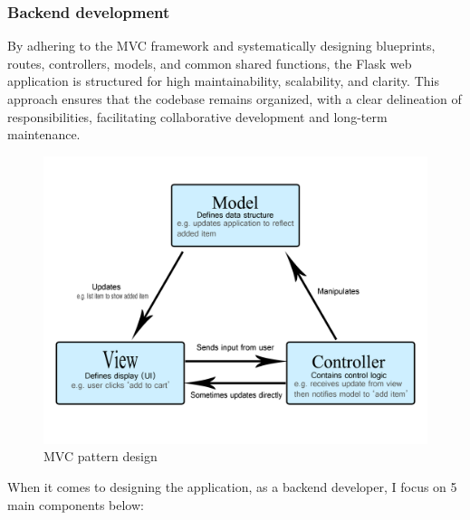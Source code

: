     


    \subsubsection{Backend development}
    By adhering to the MVC framework and systematically designing blueprints, routes, controllers, models, and common shared functions, the Flask web application is structured for high maintainability, scalability, and clarity. This approach ensures that the codebase remains organized, with a clear delineation of responsibilities, facilitating collaborative development and long-term maintenance.

    \begin{figure}[H]
			\centering
			\includegraphics[scale=0.8]{graphics/model-view-controller-light-blue.png}
			\caption{MVC pattern design \cite{mvc}}
			\label{fig:MVC}
	\end{figure}
    
    
    When it comes to designing the application, as a backend developer, I focus on 5 main components below:

